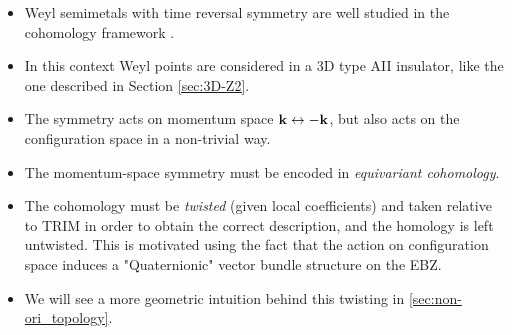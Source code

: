 {\color{blue}
\begin{itemize}
	\item Weyl semimetals with time reversal symmetry are well studied in the cohomology framework \cite{Thiang_equivariant}.
	
	\item In this context Weyl points are considered in a 3D type AII insulator, like the one described in Section \ref{sec:3D-Z2}.
	
	\item The symmetry acts on momentum space $\vb{k} \leftrightarrow -\vb{k}$, but also acts on the configuration space in a non-trivial way.
	
	\item The momentum-space symmetry must be encoded in \emph{equivariant cohomology}.
	
	\item The cohomology must be \emph{twisted} (given local coefficients) and taken relative to TRIM in order to obtain the correct description, and the homology is left untwisted. This is motivated using the fact that the action on configuration space induces a "Quaternionic" vector bundle structure on the EBZ.
	
	\item We will see a more geometric intuition behind this twisting in \ref{sec:non-ori_topology}.
\end{itemize}
}